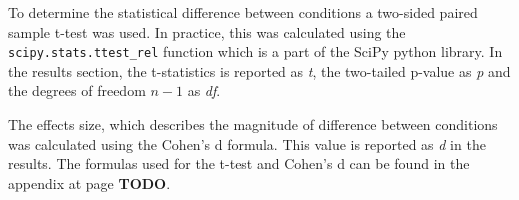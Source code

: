 To determine the statistical difference between conditions a two-sided paired sample t-test was used. In practice, this was calculated using the \texttt{scipy.stats.ttest\_rel} function which is a part of the SciPy python library. In the results section, the t-statistics is reported as \emph{t}, the two-tailed p-value as \emph{p} and the degrees of freedom $n-1$ as \emph{df}.

The effects size, which describes the magnitude of difference between conditions was calculated using the Cohen's d formula. This value is reported as \emph{d} in the results. The formulas used for the t-test and Cohen's d can be found in the appendix at page \textbf{TODO}.